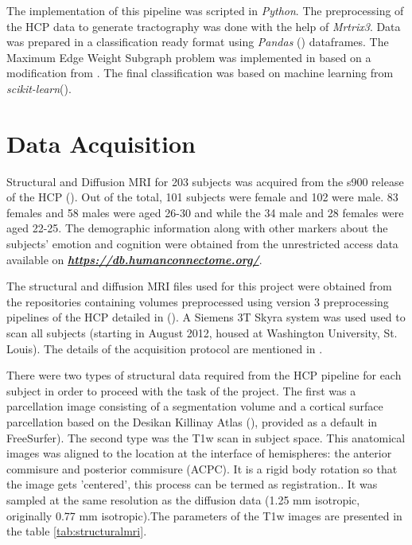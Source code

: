 \documentclass[msthesis.tex]{subfiles}
\begin{document}
The implementation of this pipeline was scripted in \textit{Python}. The preprocessing of the HCP data to generate tractography was done with the help of \textit{Mrtrix3}.  Data was prepared in a classification ready format using \textit{Pandas} (\cite{pandas_2020}) dataframes. The Maximum Edge Weight Subgraph problem was implemented in  based on a modification from \cite{DBLP:journals/corr/LobodaAS16}. The final classification was based on machine learning from \textit{scikit-learn}(\cite{sklearn_2012}). 

\section{Data Acquisition}
\label{sec:acquisition}
Structural and Diffusion MRI for 203 subjects was acquired from the s900 release of the HCP (\cite{hcp2015wu}). Out of the total, 101 subjects were female and 102 were male. 83 females and 58 males were aged 26-30 and while the 34 male and 28 females were aged 22-25. The demographic information along with other markers about the subjects' emotion and cognition were obtained from the unrestricted access data available on \href{https://db.humanconnectome.org/}{\textbf{\textit{https://db.humanconnectome.org/}}}.


The structural and diffusion MRI files used for this project were obtained from the repositories containing volumes preprocessed using version 3 preprocessing pipelines of the HCP detailed in (\cite{GLASSER2013105}). A Siemens 3T Skyra system was used used to scan all subjects (starting in August 2012, housed at Washington University, St. Louis). The details of the acquisition protocol are mentioned in \cite{van2012human}.


There were two types of structural data required from the HCP pipeline for each subject in order to proceed with the task of the project. The first was a parcellation image consisting of a segmentation volume and a cortical surface parcellation based on the Desikan Killinay Atlas (\cite{desikan2006automated}), provided as a default in FreeSurfer). The second type was the T1w scan in subject space. This anatomical images was aligned to the location at the interface of hemispheres: the anterior commisure and posterior commisure (ACPC). It is a rigid body rotation so that the image gets 'centered', this process can be termed as registration.. It was sampled at the same resolution as the diffusion data (1.25 mm isotropic, originally 0.77 mm isotropic).The parameters of the T1w images are presented in the table \ref{tab:structuralmri}.
\end{document}
